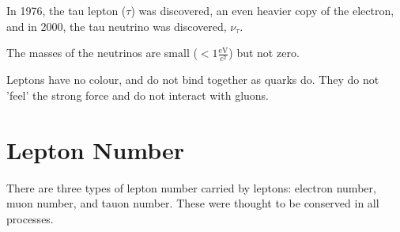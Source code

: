 \documentclass[10pt,a4paper]{article}
\newcommand{\evcc}{\frac{\mathrm{eV}}{c^2}}
\begin{document}
In 1976, the tau lepton ($\tau$) was discovered, an even heavier copy of the electron, and in 2000, the tau neutrino was discovered, $\nu_{\tau}$.

The masses of the neutrinos are small ($< 1 \evcc$) but not zero.

Leptons have no colour, and do not bind together as quarks do. They do not 'feel' the strong force and do not interact with gluons.

\section*{Lepton Number}

There are three types of lepton number carried by leptons: electron number, muon number, and tauon number. These were thought to be conserved in all processes.
\end{document}
